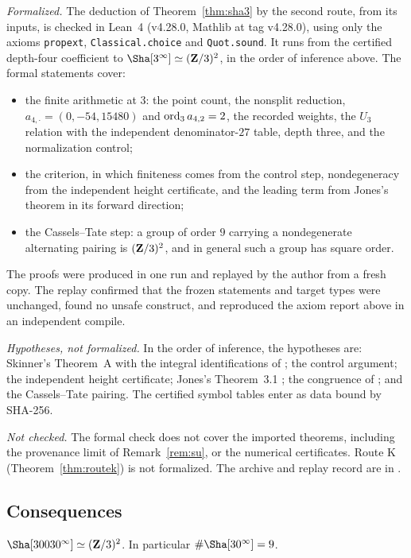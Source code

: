 \begin{remark}\label{rem:a5lean}
\emph{Formalized.} The deduction of Theorem~\ref{thm:sha3} by the second route, from its inputs, is checked in Lean~4 (v4.28.0, Mathlib at tag v4.28.0), using only the axioms \texttt{propext}, \texttt{Classical.choice} and \texttt{Quot.sound}. It runs from the certified depth-four coefficient to $\Sha[3^\infty]\simeq(\Z/3)^2$, in the order of inference above. The formal statements cover:
\begin{itemize}[leftmargin=*]
\item the finite arithmetic at $3$: the point count, the nonsplit reduction, $a_{4,\cdot}=(0,-54,15480)$ and $\operatorname{ord}_3a_{4,2}=2$, the recorded weights, the $U_3$ relation with the independent denominator-$27$ table, depth three, and the normalization control;
\item the criterion, in which finiteness comes from the control step, nondegeneracy from the independent height certificate, and the leading term from Jones's theorem in its forward direction;
\item the Cassels--Tate step: a group of order $9$ carrying a nondegenerate alternating pairing is $(\mathbf{Z}/3)^2$, and in general such a group has square order.
\end{itemize}
The proofs were produced in one run and replayed by the author from a fresh copy. The replay confirmed that the frozen statements and target types were unchanged, found no unsafe construct, and reproduced the axiom report above in an independent compile.

\emph{Hypotheses, not formalized.} In the order of inference, the hypotheses are: Skinner's Theorem~A \cite{skinner} with the integral identifications of \cite{gv}; the control argument; the independent height certificate; Jones's Theorem~3.1 \cite{jones}; the congruence of \cite[Prop.~3.5]{sw}; and the Cassels--Tate pairing. The certified symbol tables enter as data bound by SHA-256.

\emph{Not checked.} The formal check does not cover the imported theorems, including the provenance limit of Remark~\ref{rem:su}, or the numerical certificates. Route K (Theorem~\ref{thm:routek}) is not formalized. The archive and replay record are in .
\end{remark}

\subsection{Consequences}
\begin{corollary}[\cid{S.P}]\label{cor:small}
$\Sha[30030^\infty]\simeq(\Z/3)^2$. In particular $\#\Sha[30^\infty]=9$.
\end{corollary}

